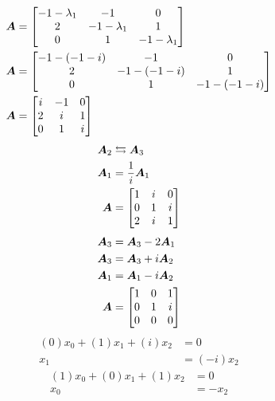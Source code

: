 \documentclass{article}
\begin{document}
\begin{align*}
	\bm{A} & = \begin{bmatrix}
		-1 - \lambda_1 & -1 & 0 \\
		2 & -1 - \lambda_1 & 1 \\
		0 & 1 & -1 - \lambda_1
	\end{bmatrix} \\
	\bm{A} & = \begin{bmatrix}
		-1 - (-1 - i) & -1 & 0 \\
		2 & -1 - (-1 - i) & 1 \\
		0 & 1 & -1 - (-1 - i)
	\end{bmatrix} \\
	\bm{A} & = \begin{bmatrix}
		i & -1 & 0 \\
		2 & i & 1 \\
		0 & 1 & i
	\end{bmatrix} \\
\end{align*}
\begin{align*}
	\bm{A}_2 & \leftrightarrows \bm{A}_3 \\
	\bm{A}_1 & = \frac{1}{i}\bm{A}_1 \\
	\bm{A} & =\begin{bmatrix}
		1 & i & 0 \\
		0 & 1 & i \\
		2 & i & 1
	\end{bmatrix}
\end{align*}
\begin{align*}
	\bm{A}_3 & = \bm{A}_3 - 2\bm{A}_1 \\
	\bm{A}_3 & = \bm{A}_3 + i\bm{A}_2 \\
	\bm{A}_1 & = \bm{A}_1 - i\bm{A}_2 \\
	\bm{A} & =\begin{bmatrix}
		1 & 0 & 1 \\
		0 & 1 & i \\
		0 & 0 & 0
	\end{bmatrix}
\end{align*}
\begin{align*}
	(0)x_0 + (1)x_1 + (i)x_2 & = 0 \\
	x_1 & = (-i)x_2
\end{align*}
\begin{align*}
	(1)x_0 + (0)x_1 + (1)x_2 & = 0 \\
	x_0 & = -x_2
\end{align*}
\end{document}

